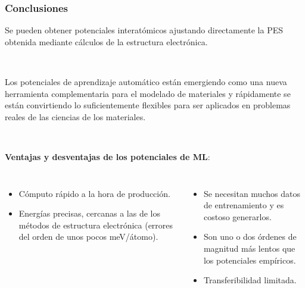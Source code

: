 \documentclass[aspectratio=169]{beamer}
\let\oldtextbf\textbf
\renewcommand{\textbf}[1]{\textcolor{nordblue}{\oldtextbf{#1}}}
\begin{document}
    \begin{frame}
        \frametitle{Conclusiones}

        Se pueden obtener potenciales interatómicos ajustando directamente la
        PES obtenida mediante cálculos de la estructura electrónica.
        
        \ \pause

        Los potenciales de aprendizaje automático están emergiendo como una nueva
        herramienta complementaria para el modelado de materiales y rápidamente 
        se están convirtiendo lo suficientemente flexibles para ser aplicados 
        en problemas reales de las ciencias de los materiales.


        \ \pause

        \textbf{Ventajas y desventajas de los potenciales de ML}:

        \pause 

        \begin{columns}
            \begin{itemize}
                \item Cómputo rápido a la hora de producción.
                \item Energías precisas, cercanas a las de los métodos de 
                    estructura electrónica (errores del orden de unos pocos 
                    meV/átomo).
            \end{itemize}

            \pause

            \begin{itemize}
                \item Se necesitan muchos datos de entrenamiento y es costoso 
                    generarlos.
                \item Son uno o dos órdenes de magnitud más lentos que los 
                    potenciales empíricos.
                \item Transferibilidad limitada. 
            \end{itemize}
        \end{columns}

    \end{frame}

\end{document}
